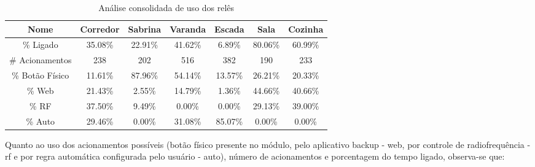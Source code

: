 \begin{table}[H]
	\caption{Análise consolidada de uso dos relês}
	\setlength\tabcolsep{1.5pt}
	\centering
	\footnotesize
	\begin{tabular}{ccccccc}
		\textbf{Nome} &
		\textbf{Corredor} &
		\textbf{Sabrina} &
		\textbf{Varanda} &
		\textbf{Escada} &
		\textbf{Sala} &
		\textbf{Cozinha} \\
		\midrule
		\% Ligado &
		35.08\% &
		22.91\% &
		41.62\% &
		6.89\% &
		80.06\% &
		60.99\% \\
		\# Acionamentos &
		238 &
		202 &
		516 &
		382 &
		190 &
		233 \\
		\% Botão Físico &
		11.61\% &
		87.96\% &
		54.14\% &
		13.57\% &
		26.21\% &
		20.33\% \\
		\% Web &
		21.43\% &
		2.55\% &
		14.79\% &
		1.36\% &
		44.66\% &
		40.66\% \\
		\% RF &
		37.50\% &
		9.49\% &
		0.00\% &
		0.00\% &
		29.13\% &
		39.00\% \\
		\% Auto &
		29.46\% &
		0.00\% &
		31.08\% &
		85.07\% &
		0.00\% &
		0.00\% \\
	\end{tabular}
\end{table}

Quanto ao uso dos acionamentos possíveis (botão físico presente no módulo, pelo aplicativo backup - web, por controle de radiofrequência - rf e por regra automática configurada pelo usuário - auto), número de acionamentos e porcentagem do tempo ligado, observa-se que:


